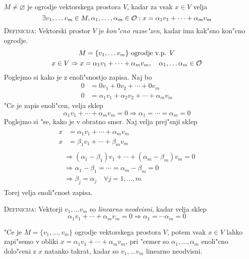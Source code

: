 $M \neq \varnothing$ je ogrodje vektorskega prostora $V$, kadar za vsak $x \in V$ velja
\begin{equation*}
\exists v_1, \dots v_m \in M, \alpha_1, \ldots, \alpha_m \in \mathcal{O}: x = \alpha_1 v_1 + \cdots + \alpha_m v_m
\end{equation*}
\textsc{Definicija:} Vektorski prostor $V$ je \emph{kon"cno razse"zen}, kadar ima kak"sno kon"cno ogrodje.
\begin{gather*}
M = \{v_1, \ldots v_m\} \text{ ogrodje v.p. $V$} \\
x \in V \Rightarrow x = \alpha_1v_1 + \cdots + \alpha_m v_m, \quad \alpha_1,\ldots \alpha_m \in \mathcal{O}
\end{gather*}
Poglejmo si kako je z enoli"snostjo zapisa. Naj bo
\begin{align*}
0 &= 0v_1 + 0v_2 + \cdots + 0v_m \\
0 &= \alpha_1 v_1 + \alpha_2 v_2 + \cdots + \alpha_m v_m
\end{align*}
"Ce je zapis enoli"cen, velja sklep
\begin{equation*}
\alpha_1v_1 + \cdots + \alpha_m v_m = 0 \Rightarrow \alpha_1 = \cdots = \alpha_m = 0
\end{equation*}
Poglejmo si "se, kako je v obratno smer. Naj velja prej"snji sklep
\begin{gather*}
\begin{aligned}
x &= \alpha_1 v_1 + \cdots + \alpha_m v_m \\
x &= \beta_1 v_1 + \cdots + \beta_m v_m
\end{aligned}\\
\begin{aligned}
&\Rightarrow (\alpha_1 - \beta_1)v_1 + \cdots + (\alpha_m - \beta_m)v_m = 0 \\
&\Rightarrow \alpha_1 -\beta_1 = \cdots = \alpha_m - \beta_m = 0 \\
&\Rightarrow \beta_j = \alpha_j \quad \forall j = 1, \ldots, m
\end{aligned}
\end{gather*}
Torej velja enoli"cnost zapisa.

\textsc{Definicija:} Vektorji $v_1, \ldots v_m$ so \emph{linearno neodvisni}, kadar velja sklep
\begin{equation*}
\alpha_1 v_1 + \cdots + \alpha_m v_m = 0 \Rightarrow \alpha_1 = \cdots \alpha_m = 0
\end{equation*}

"Ce je $M = \{v_1, \ldots, v_m\}$ ogrodje vektorskega prostora $V$, potem vsak $x \in V$ lahko zapi"semo v obliki $x = \alpha_1 v_1 + \cdots + \alpha_m v_m$, pri "cemer so $\alpha_1, \ldots, \alpha_m$ enoli"cno dolo"ceni z $x$ natanko takrat, kadar so $v_1, \ldots v_m$ linearno neodvisni.

